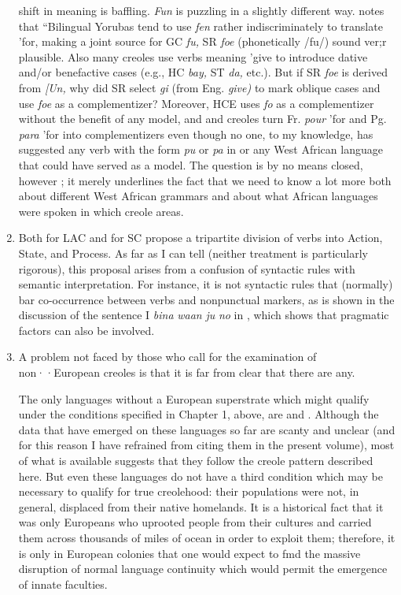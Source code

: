 \begin{enumerate}
shift in meaning is baffling. \textit{Fun} is puzzling in a slightly different way. \citet{Rowlands1969} notes that ``Bilingual Yorubas tend to use \textit{fen} rather indiscriminately to translate 'for, making a joint source for GC \textit{fu,} SR \textit{foe }(phonetically /fu/) sound ver;r plausible. Also many creoles use
verbs meaning 'give to introduce dative and/or benefactive cases (e.g., HC \textit{bay,} ST \textit{da,} etc.). But if SR \textit{foe} is derived from  \textit{[Un,} why did SR select \textit{gi} (from Eng. \textit{give}\textit{)} to mark oblique cases and use \textit{foe} as a complementizer? Moreover, HCE uses \textit{fo} as a complementizer without the benefit of any  model, and  and  creoles turn Fr. \textit{pour} 'for and Pg. \textit{para} 'for into complementizers even though no one, to my knowledge, has suggested any verb with the form \textit{pu} or \textit{pa} in  or any West African language that could have served as a model. The question is by no means closed, however ; it merely underlines the fact that we need to know a lot more both about different West African grammars and about what African lan\-guages were spoken in which creole areas. 
\item Both \citet{Christie1976} for LAC and \citet{Corne1981} for SC propose a tripartite division of verbs into Action, State, and Process. As far as I can tell (neither treatment is particularly rigorous), this proposal arises from a confusion of syntactic rules with semantic interpretation. For instance, it is not syntactic rules that (normally) 
bar co-occurrence between  verbs and nonpunctual markers, as is shown in the discussion of the sentence I \textit{bina} \textit{waan} \textit{ju} \textit{no} in \citet[38]{Bickerton1975}, which shows that pragmatic factors can also be involved.
\item A problem not faced by those who call for the examination of non··European creoles is that it is far from clear that there are any.

The only languages without a European superstrate which might qualify under the conditions specified in Chapter 1, above, are  and . Although the data that have emerged on these lan\-guages so far are scanty and unclear (and for this reason I have refrained from citing them in the present volume), most of what is available suggests that they follow the creole pattern described here. But even these languages do not have a third condition which may be necessary to qualify for true creolehood: their populations were not, in general, displaced from their native homelands. It is a historical fact that it was only Europeans who uprooted people from their cultures and carried them across thousands of miles of ocean in order to exploit them;
therefore, it is only in European colonies that one would expect to fmd the massive disruption of normal language continuity which would permit the emergence of innate faculties.


\end{enumerate}
